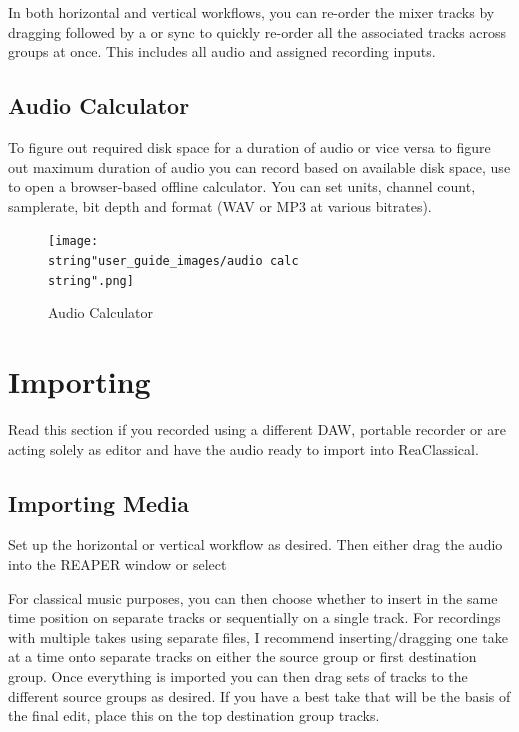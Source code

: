 \documentclass[10pt,american]{article}
\begin{document}
In both horizontal and vertical workflows, you can re-order the mixer tracks by
dragging followed by a  or  sync to quickly re-order all the
associated tracks across groups at once. This includes all audio and assigned
recording inputs.

\subsection{Audio Calculator}

To figure out required disk space for a duration of audio or vice versa to
figure out maximum duration of audio you can record based on available disk
space, use  to open a browser-based offline calculator. You can
set units, channel count, samplerate, bit depth and format (WAV or MP3 at
various bitrates).

\begin{figure}
\begin{centering}
\texttt{[image: \\string"user\_guide\_images/audio calc\\string".png]}
\par\end{centering}
\caption{Audio Calculator}
\end{figure}


\section{Importing}

Read this section if you recorded using a different DAW, portable recorder or
are acting solely as editor and have the audio ready to import into
ReaClassical. 

\subsection{Importing Media}

Set up the horizontal or vertical workflow as desired. Then either drag the
audio into the REAPER window or select 

For classical music purposes, you can then choose whether to insert in the same
time position on separate tracks or sequentially on a single track. For
recordings with multiple takes using separate files, I recommend
inserting/dragging one take at a time onto separate tracks on either the source
group or first destination group. Once everything is imported you can then drag
sets of tracks to the different source groups as desired. If you have a best
take that will be the basis of the final edit, place this on the top destination
group tracks.
\end{document}
